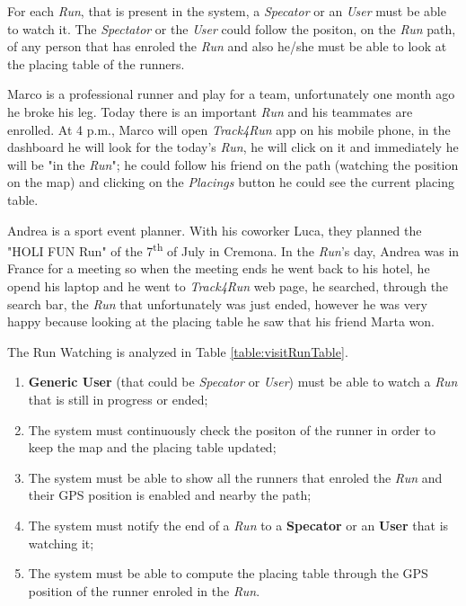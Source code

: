 For each \textit{Run}, that is present in the system, a \textit{Specator} or an \textit{User} must be able to watch it. The \textit{Spectator} or the \textit{User} could follow the positon, on the \textit{Run} path, of any person that has enroled the \textit{Run} and also he/she must be able to look at the placing table of the runners.

Marco is a professional runner and play for a team, unfortunately one month ago he broke his leg. Today there is an important \textit{Run} and his teammates are enrolled. At 4 p.m., Marco will open \textit{Track4Run} app on his mobile phone, in the dashboard he will look for the today's \textit{Run}, he will click on it and immediately he will be "in the \textit{Run}"; he could follow his friend on the path (watching the position on the map) and clicking on the \textit{Placings} button he could see the current placing table.

Andrea is a sport event planner. With his coworker Luca, they planned the "HOLI FUN Run" of the 7\textsuperscript{th} of July in Cremona. In the \textit{Run}'s day, Andrea was in France for a meeting so when the meeting ends he went back to his hotel, he opend his laptop and he went to \textit{Track4Run} web page, he searched, through the search bar, the \textit{Run} that unfortunately was just ended, however he was very happy because looking at the placing table he saw that his friend Marta won.

The Run Watching is analyzed in Table \ref{table:visitRunTable}.

\begin{enumerate}
  \item \textbf{Generic User} (that could be \textit{Specator} or \textit{User}) must be able to watch a \textit{Run} that is still in progress or ended;
  \item The system must continuously check the positon of the runner in order to keep the map and the placing table updated;
  \item The system must be able to show all the runners that enroled the \textit{Run} and their GPS position is enabled and nearby the path;
  \item The system must notify the end of a \textit{Run} to a \textbf{Specator} or an \textbf{User} that is watching it;
  \item The system must be able to compute the placing table through the GPS position of the runner enroled in the \textit{Run}.
\end{enumerate}

